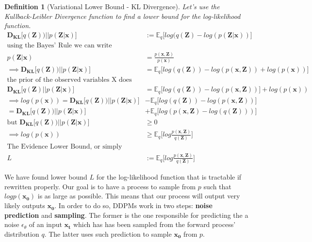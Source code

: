 \documentclass{article}
\newtheorem{definition}{Definition}[section]
\begin{document}
\begin{definition}[Variational Lower Bound - KL Divergence]	
		Let's use the Kullback-Leibler Divergence function to find a lower bound for the log-likelihood function.
	\begin{align}
		\mathbf{D_{KL}}\big[ q(\mathbf{Z}))  ||  p(\mathbf{Z | x}) \big] & := \mathbb{E}_q\big[ log(q(\mathbf{Z})  -  log(p(\mathbf{Z | x })) \big] \\
		\text{using the Bayes' Rule we can write} & \\
		p(\mathbf{Z | x}) &= \frac{p(\mathbf{x, Z})}{p(\mathbf{x})} \\
		\implies 	\mathbf{D_{KL}}\big[ q(\mathbf{Z}))  ||  p(\mathbf{Z | x}) \big] &= \mathbb{E}_q\big[ log(q(\mathbf{Z}))  -  log(p(\mathbf{x, Z})) + log(p(\mathbf{x})) \big] \\
		\text{the prior of the observed variables X does not depend on q} & \\
		\mathbf{D_{KL}}\big[ q(\mathbf{Z})  ||  p(\mathbf{Z | x}) \big] &= \mathbb{E}_q\big[ log(q(\mathbf{Z}))  -  log(p(\mathbf{x, Z})) \big] + log(p(\mathbf{x})) \\
		\implies log(p(\mathbf{x})) = 	\mathbf{D_{KL}}\big[ q(\mathbf{Z}))  ||  p(\mathbf{Z | x}) \big] & -   \mathbb{E}_q\big[ log(q(\mathbf{Z}))  -  log(p(\mathbf{x, Z})) \big] \\
		 = 	\mathbf{D_{KL}}\big[ q(\mathbf{Z}))  ||  p(\mathbf{Z | x}) \big] & +   \mathbb{E}_q\big[  log(p(\mathbf{x, Z}) - log(q(\mathbf{Z}))) \big] \\
		\text{but   }	\mathbf{D_{KL}}\big[ q(\mathbf{Z}))  ||  p(\mathbf{Z | x}) \big] & \geq 0 \\
		\implies log(p(\mathbf{x})) &\geq  \mathbb{E}_q\bigg[log \frac{p(\mathbf{x, Z})} {q(\mathbf{Z})}\bigg] \\
		\text{The Evidence Lower Bound, or simply ELBO, is :}  &\\
		L &:=   \mathbb{E}_q\bigg[log \frac{p(\mathbf{x, Z})} {q(\mathbf{Z})}\bigg]
	\end{align}
\end{definition}

We have found lower bound $L$ for the log-likelihood function that is tractable if rewritten properly. Our goal is to have a process to sample from $p$ such that $log p(\mathbf{x_0})$ is as large as possible. This means that our process will output very likely outputs $\mathbf{x_0}$. In order to do so, DDPMs work in two steps: \textbf{noise prediction} and \textbf{sampling}. The former is the one responsible for predicting the a noise $\epsilon_\theta$ of an input $\mathbf{x_t}$ which has has been sampled from the forward process' distribution $q$. The latter uses such prediction to sample $\mathbf{x_0}$ from $p$.
\end{document}
